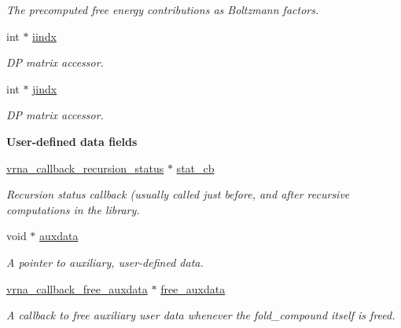 \begin{Indent}
\begin{DoxyCompactItemize}
\begin{DoxyCompactList}\small\item\em The precomputed free energy contributions as Boltzmann factors. \end{DoxyCompactList}\item 
\mbox{\label{group__fold__compound_afdead4cf55c882d3497e779573e17e03}} 
int $\ast$ \mbox{\hyperlink{group__fold__compound_afdead4cf55c882d3497e779573e17e03}{iindx}}
\begin{DoxyCompactList}\small\item\em DP matrix accessor. \end{DoxyCompactList}\item 
\mbox{\label{group__fold__compound_a5037235dee512efd85ca543780bbca1a}} 
int $\ast$ \mbox{\hyperlink{group__fold__compound_a5037235dee512efd85ca543780bbca1a}{jindx}}
\begin{DoxyCompactList}\small\item\em DP matrix accessor. \end{DoxyCompactList}\end{DoxyCompactItemize}
\end{Indent}
\begin{Indent}\textbf{ User-\/defined data fields}\par
\begin{DoxyCompactItemize}
\item 
\mbox{\hyperlink{group__fold__compound_gac86036fa8cad1108832335063243cdc8}{vrna\+\_\+callback\+\_\+recursion\+\_\+status}} $\ast$ \mbox{\hyperlink{group__fold__compound_a87a83f6795b569000efcbe65acc3dd81}{stat\+\_\+cb}}
\begin{DoxyCompactList}\small\item\em Recursion status callback (usually called just before, and after recursive computations in the library. \end{DoxyCompactList}\item 
void $\ast$ \mbox{\hyperlink{group__fold__compound_a20048e0c369e9f24b55423d600037c68}{auxdata}}
\begin{DoxyCompactList}\small\item\em A pointer to auxiliary, user-\/defined data. \end{DoxyCompactList}\item 
\mbox{\hyperlink{group__fold__compound_ga7806651f51b195013839a218b3bbd5a3}{vrna\+\_\+callback\+\_\+free\+\_\+auxdata}} $\ast$ \mbox{\hyperlink{group__fold__compound_a8e84dbabab016ecd74da6c38cb94e816}{free\+\_\+auxdata}}
\begin{DoxyCompactList}\small\item\em A callback to free auxiliary user data whenever the fold\+\_\+compound itself is free\textquotesingle{}d. \end{DoxyCompactList}\end{DoxyCompactItemize}
\end{Indent}
